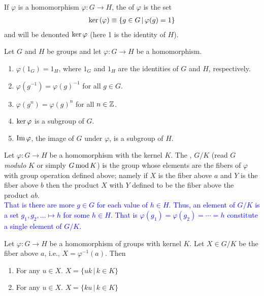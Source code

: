 \documentclass[10pt,a4paper]{report}
\newcommand{\BLUE}[1]{\textcolor{blue}{#1}}
\begin{document}
\begin{definition}[Kernel] If $\varphi$ is a homomorphism $\varphi: G \to H$, the  of $\varphi$ is the set
\begin{align*}
	\text{ker}\,(\varphi) \equiv \{g \in G\,|\,\varphi(g)=1\}
\end{align*}and will be denonted $\text{ker}\, \varphi$ (here 1 is the identity of $H$).
\end{definition}

\begin{prop}Let $G$ and $H$ be groups and let $\varphi: G \to H$ be a homomorphism.
\begin{enumerate}
	\item $\varphi(1_G)=1_H$, where $1_G$ and $1_H$ are the identities of $G$ and $H$, respectively.
	\item $\varphi(g^{-1})=\varphi(g)^{-1}$ for all $g \in G$.
	\item $\varphi(g^n)=\varphi(g)^n$ for all $n \in \mathbb{Z}$.
	\item $\text{ker}\, \varphi$ is a subgroup of $G$.
	\item $\operatorname{Im}\varphi$, the image of $G$ under $\varphi$, is a subgroup of $H$.
\end{enumerate}
\end{prop}

\begin{definition}Let $\varphi:G\to H$ be a homomorphism with the kernel $K$.  The , $G/K$ (read $G$  \textit{modulo} $K$ or simply $G\operatorname{mod} K$) is the group whose elements are the fibers of $\varphi$ with group operation defined above;  namely if $X$ is the fiber above $a$ and $Y$ is the fiber above $b$ then the product $X$ with $Y$ defined to be the fiber above the product $ab$.\\
\BLUE{That is there are more $g \in G$ for each value of $h \in H$.  Thus, an element of $G/K$ is a set $g_1, g_2, \dots \mapsto h$ for some $h \in H$.  That is $\varphi(g_1)=\varphi(g_2)=\cdots= h$ constitute a single element of $G/K$.
}
\end{definition}

\begin{prop}Let $\varphi:G \to H$ be a homomorphism of groups with kernel $K$.  Let $X \in G/K$ be the fiber above $a$, i.e., $X=\varphi^{-1}(a)$.  Then
\begin{enumerate}
	\item For any $u \in X$.  $X=\{uk\,|\,k\in K\}$
	\item For any $u \in X$.  $X=\{ku\,|\,k \in K\}$
\end{enumerate}
\end{prop}
\end{document}
